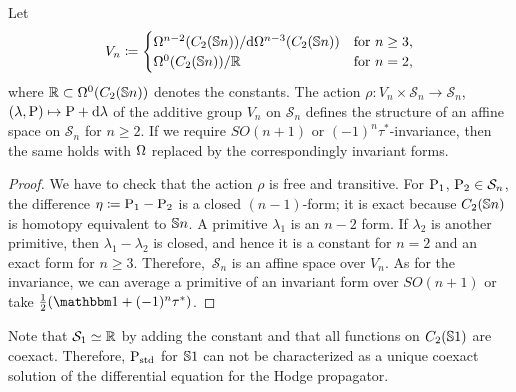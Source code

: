 \documentclass[\MainFolder/Text.tex]{subfiles}
\newcommand{\Soln}{\mathcal{S}}
\begin{document}
\begin{Proposition}\label{Prop:SpaceOfSolnSn}
Let
$$ V_n\coloneqq \begin{cases}
\Omega^{n-2}(C_2(\mathbb{S}{n}))/\mathrm{d} \Omega^{n-3}(C_2(\mathbb{S}{n})) & \text{for } n\ge 3, \\
\Omega^{0}(C_2(\mathbb{S}{n}))/\mathbb{R} & \text{for }n=2,
\end{cases}$$
where $\mathbb{R}\subset\Omega^0(C_2(\mathbb{S}{n}))$ denotes the constants. The action $\rho: V_n \times \Soln_n \rightarrow \Soln_n$, $(\lambda,\mathrm{P})\mapsto \mathrm{P} + \mathrm{d}\lambda$ of the additive group $V_n$ on $\Soln_n$ defines the structure of an affine space on $\Soln_n$ for $n\ge 2$. If we require $SO(n+1)$ or $(-1)^n\tau^*$-invariance, then the same holds with $\Omega$ replaced by the correspondingly invariant forms.
\end{Proposition}
\begin{proof}
We have to check that the action $\rho$ is free and transitive. For $\mathrm{P}_1$, $\Prpg_2\in \Soln_n$, the difference $\eta \coloneqq \mathrm{P}_1 - \mathrm{P}_2$ is a closed $(n-1)$-form; it is exact because $C_2(\mathbb{S}{n})$ is homotopy equivalent to $\mathbb{S}{n}$. A primitive $\lambda_1$ is an $n-2$ form. If $\lambda_2$ is another primitive, then $\lambda_1 - \lambda_2$ is closed, and hence it is a constant for $n=2$ and an exact form for $n \ge 3$. Therefore,~$\Soln_n$ is an affine space over $V_n$. As for the invariance, we can average a primitive of an invariant form over $SO(n+1)$ or take $\frac{1}{2}(\Id + (-1)^n \tau^*)$.
\end{proof}

Note that $\Soln_1 \simeq \R$ by adding the constant and that all functions on $C_2(\mathbb{S}{1})$ are coexact. Therefore, $\mathrm{P}_{\mathrm{std}}$ for $\mathbb{S}{1}$ can not be characterized as a unique coexact solution of the differential equation for the Hodge propagator.
\end{document}
